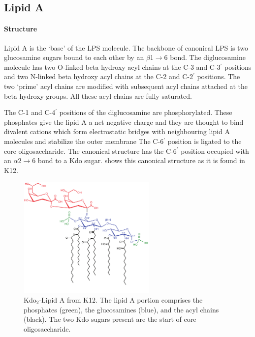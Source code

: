   \subsection{Lipid A}\label{sec:lipidA-intro}
  
    \paragraph{Structure}
    
    Lipid A is the `base' of the \ac{LPS} molecule. The backbone of canonical \ac{LPS} is two glucosamine sugars bound to each other by an $\beta$1$\rightarrow$6 bond. The diglucosamine molecule has two O-linked beta hydroxy acyl chains at the C-3 and C-3$^\prime$ positions and two N-linked beta hydroxy acyl chains at the C-2 and C-2$^\prime$ positions. The two `prime' acyl chains are modified with subsequent acyl chains attached at the beta hydroxy groups. All these acyl chains are fully saturated.
    
    The C-1 and C-4$^\prime$ positions of the diglucosamine are phosphorylated. These phosphates give the lipid A a net negative charge and they are thought to bind divalent cations which form electrostatic bridges with neighbouring lipid A molecules and stabilize the outer membrane
    The C-6$^\prime$ position is ligated to the core oligosaccharide. The canonical structure has the C-6$^\prime$ position occupied with an $\alpha$2$\rightarrow$6 bond to a Kdo sugar.
     shows this canonical structure as it is found in \ecoli K12.

\begin{figure}[htb]
  	\begin{center}
   		\includegraphics[width=0.6\textwidth]{intro/img/lipidA.pdf}
   	\end{center}
   	\caption[Kdo$_{2}$-Lipid A from \ecoli K12]{ 
Kdo$_{2}$-Lipid A from \ecoli K12. The lipid A portion comprises the phosphates (green), the glucosamines (blue), and the acyl chains (black). The two Kdo sugars present are the start of core oligosaccharide.
}
\label{fig:lipidA}
\end{figure}   

